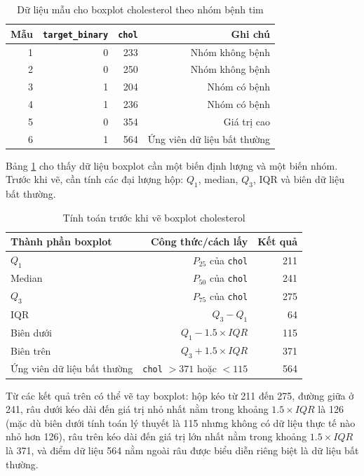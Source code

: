 \begin{table}[H]
\centering
\caption{Dữ liệu mẫu cho boxplot cholesterol theo nhóm bệnh tim}
\label{tab:chapter1_boxplot_sample_data}
\small
\begin{tabular}{rrrr}
\toprule
Mẫu & \texttt{target\_binary} & \texttt{chol} & Ghi chú \\
\midrule
1 & 0 & 233 & Nhóm không bệnh \\
2 & 0 & 250 & Nhóm không bệnh \\
3 & 1 & 204 & Nhóm có bệnh \\
4 & 1 & 236 & Nhóm có bệnh \\
5 & 0 & 354 & Giá trị cao \\
6 & 1 & 564 & Ứng viên dữ liệu bất thường \\
\bottomrule
\end{tabular}
\end{table}

Bảng \ref{tab:chapter1_boxplot_sample_data} cho thấy dữ liệu boxplot cần một biến định lượng và một biến nhóm. Trước khi vẽ, cần tính các đại lượng hộp: $Q_1$, median, $Q_3$, IQR và biên dữ liệu bất thường.

\begin{table}[H]
\centering
\caption{Tính toán trước khi vẽ boxplot cholesterol}
\label{tab:chapter1_boxplot_calc}
\small
\begin{tabular}{lrr}
\toprule
Thành phần boxplot & Công thức/cách lấy & Kết quả \\
\midrule
$Q_1$ & $P_{25}$ của \texttt{chol} & 211 \\
Median & $P_{50}$ của \texttt{chol} & 241 \\
$Q_3$ & $P_{75}$ của \texttt{chol} & 275 \\
IQR & $Q_3-Q_1$ & 64 \\
Biên dưới & $Q_1-1.5\times IQR$ & 115 \\
Biên trên & $Q_3+1.5\times IQR$ & 371 \\
Ứng viên dữ liệu bất thường & \texttt{chol} $>371$ hoặc $<115$ & 564 \\
\bottomrule
\end{tabular}
\end{table}

Từ các kết quả trên có thể vẽ tay boxplot: hộp kéo từ 211 đến 275, đường giữa ở 241, râu dưới kéo dài đến giá trị nhỏ nhất nằm trong khoảng $1.5 \times IQR$ là 126 (mặc dù biên dưới tính toán lý thuyết là 115 nhưng không có dữ liệu thực tế nào nhỏ hơn 126), râu trên kéo dài đến giá trị lớn nhất nằm trong khoảng $1.5 \times IQR$ là 371, và điểm dữ liệu 564 nằm ngoài râu được biểu diễn riêng biệt là dữ liệu bất thường.

